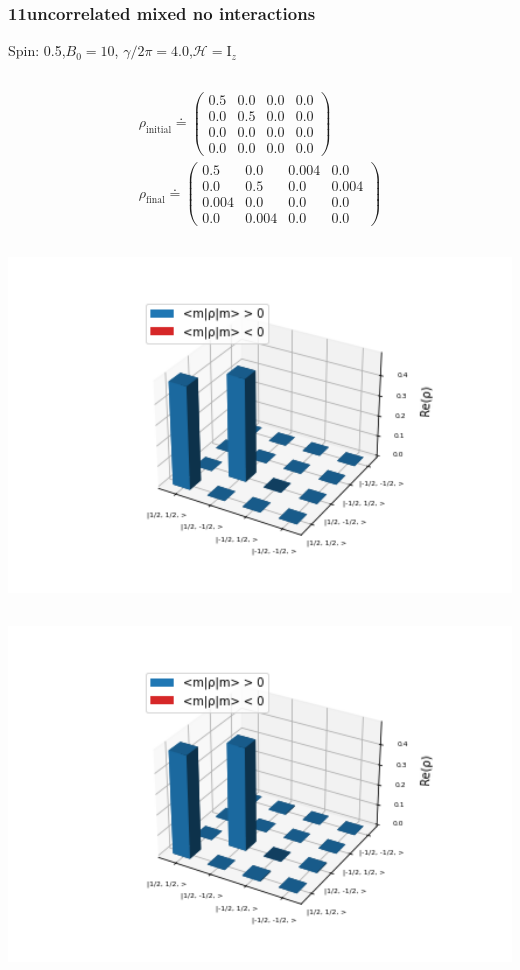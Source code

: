 \documentclass[10pt]{beamer}
\begin{document}
\begin{frame}
\frametitle{11uncorrelated mixed no interactions}
Spin: 0.5,$B_0= 10$, $\gamma/2\pi = 4.0$,$\mathcal{H}=\text{I}_{z}$
\begin{columns}[T]
\begin{column}{.5\textwidth}
\begin{align*}
\rho_{\text{initial}}\doteq
\begin{pmatrix}
0.5 & 0.0 & 0.0 & 0.0 \\
0.0 & 0.5 & 0.0 & 0.0 \\
0.0 & 0.0 & 0.0 & 0.0 \\
0.0 & 0.0 & 0.0 & 0.0
\end{pmatrix}
\\
\rho_{\text{final}}\doteq
\begin{pmatrix}
0.5 & 0.0 & 0.004 & 0.0 \\
0.0 & 0.5 & 0.0 & 0.004 \\
0.004 & 0.0 & 0.0 & 0.0 \\
0.0 & 0.004 & 0.0 & 0.0
\end{pmatrix}
\end{align*}
\begin{column}{.5\textwidth}
\includegraphics[width=1.5\textwidth]{./spin1-2/11uncorrelated_mixed_no_interactions/InitialRealPartDensityMatrix.png}
\end{column}
\begin{column}{.5\textwidth}
\includegraphics[width=1.5\textwidth]{./spin1-2/11uncorrelated_mixed_no_interactions/EvolvedRealPartDensityMatrix.png}

\end{column}
\end{column}
\end{columns}
\end{frame}
\end{document}
